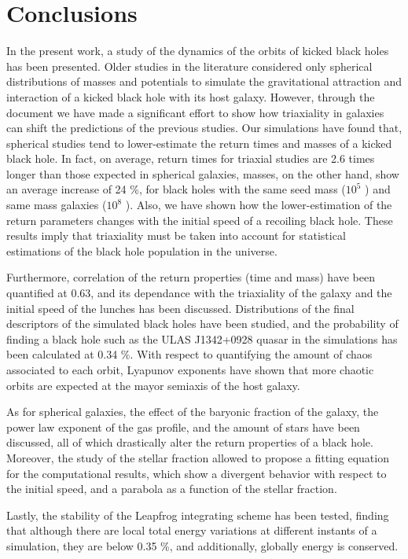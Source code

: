 
\chapter{Conclusions}\label{Conclusions}
In the present work, a study of the dynamics of the orbits of kicked black holes has been presented. Older studies in the literature considered only spherical distributions of masses and potentials to simulate the gravitational attraction and interaction of a kicked black hole with its host galaxy. However, through the document we have made a significant effort to show how triaxiality in galaxies can shift the predictions of the previous studies. Our simulations have found that, spherical studies tend to lower-estimate the return times and masses of a kicked black hole. In fact, on average, return times for triaxial studies are 2.6 times longer than those expected in spherical galaxies, masses, on the other hand, show an average increase of 24 \%, for black holes with the same seed mass ($10^5$ \sm) and same mass galaxies ($10^8$ \sm). Also, we have shown how the lower-estimation of the return parameters changes with the initial speed of a recoiling black hole. These results imply that triaxiality must be taken into account for statistical estimations of the black hole population in the universe. 

\vspace{1cm}

Furthermore, correlation of the return properties (time and mass) have been quantified at 0.63, and its dependance with the triaxiality of the galaxy and the initial speed of the lunches has been discussed. Distributions of the final descriptors of the simulated black holes have been studied, and the probability of finding a black hole such as the ULAS J1342+0928 quasar in the simulations has been calculated at 0.34 \%. With respect to quantifying the amount of chaos associated to each orbit, Lyapunov exponents have shown that more chaotic orbits are expected at the mayor semiaxis of the host galaxy.  

\vspace{1cm}

As for spherical galaxies, the effect of the baryonic fraction of the galaxy, the power law exponent of the gas profile, and the amount of stars have been discussed, all of which drastically alter the return properties of a black hole. Moreover, the study of the stellar fraction allowed to propose a fitting equation for the computational results, which show a divergent behavior with respect to the initial speed, and a parabola as a function of the stellar fraction.

\vspace{1cm}

Lastly, the stability of the Leapfrog integrating scheme has been tested, finding that although there are local total energy variations at different instants of a simulation, they are below 0.35 \%, and additionally, globally energy is conserved.